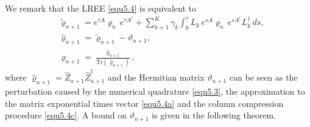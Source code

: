 \documentclass[preprint,3p,compress,12pt]{elsarticle}
\numberwithin{equation}{section}
\numberwithin{figure}{section}
\begin{document}
We remark that the LREE \eqref{equ5.4} is equivalent to
\begin{subequations}\label{equ5.6}
  \begin{align}
  &\tilde{\varrho}_{n+1}=e^{\tau A}\varrho_n \, e^{\tau A^{\dag}}+\sum_{k=1}^K\gamma_k\int_0^{\tau}L_k \, e^{sA}\varrho_n \, e^{sA^{\dag}}L_k^{\dag} \, ds,\label{equ5.6a}\\
  &\hat{\varrho}_{n+1}=\tilde{\varrho}_{n+1}-\vartheta_{n+1},\label{equ5.6b}\\
  & \varrho_{n+1}=\frac{\hat{\varrho}_{n+1}}{\mbox{Tr}(\hat{\varrho}_{n+1})},\label{equ5.6c}
\end{align}
\end{subequations}
where $\hat{\varrho}_{n+1}=\hat{Z}_{n+1}\hat{Z}_{n+1}^{\dag}$ and the Hermitian matrix $\vartheta_{n+1}$ can be seen as the perturbation caused by the numerical quadrature \eqref{equ5.3}, the approximation to the matrix exponential times vector \eqref{equ5.4a} and the column compression procedure \eqref{equ5.4c}.
A bound on $\vartheta_{n+1}$ is given in the following theorem.
\end{document}
